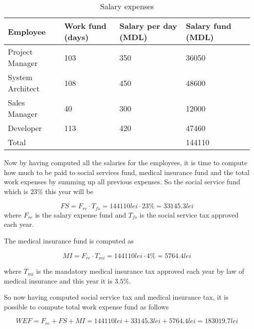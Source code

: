 \begin{table}[!ht]
\begin{center}
\caption{Salary expenses}
\begin{tabularx}{\textwidth}{| Y | M{8em} | M{8em} | M{8em} |N}
\hline
\textbf{Employee} & \textbf{Work fund (days)} & \textbf{Salary per day (MDL)} & \textbf{Salary fund (MDL)}&\\[18pt]
\hline
Project Manager & 103 & 350 & 36050 &\\[14pt]
\hline 
System Architect & 108 & 450 & 48600 &\\[14pt]
\hline
Sales Manager & 40 & 300 & 12000 &\\[14pt]
\hline
Developer & 113 & 420 & 47460 &\\[14pt]
\hline
Total & & & 144110 &\\[14pt]
\hline
\end{tabularx}
\label{table:salaries}
\end{center}
\end{table}

Now by having computed all the salaries for the employees, it is time to compute how much to be paid to social services fund, medical insurance fund and the total work expenses by summing up all previous expenses. So the social service fund which is $23\%$ this year will be 

\begin{equation}
 FS = F_{re} \cdot T_{fs} = 144110 lei \cdot 23 \% = 33145.3 lei 	
\end{equation}
\noindent
where $F_{re}$ is the salary expense fund and $T_{fs}$ is the social service tax approved each year.

The medical insurance fund is computed as

\begin{equation}
 MI = F_{re} \cdot T_{mi} = 144110 lei \cdot 4 \% = 5764.4 lei
\end{equation}

\noindent
where $T_{mi}$ is the mandatory medical insurance tax approved each year by law of medical insurance and this year it is $3.5\%$. 

So now having computed social service tax and medical insurance tax, it is possible to compute total work expense fund as follows

\begin{equation}
 WEF = F_{re} + FS + MI = 144110 lei + 33145.3 lei + 5764.4 lei = 183019.7 lei
\end{equation}

